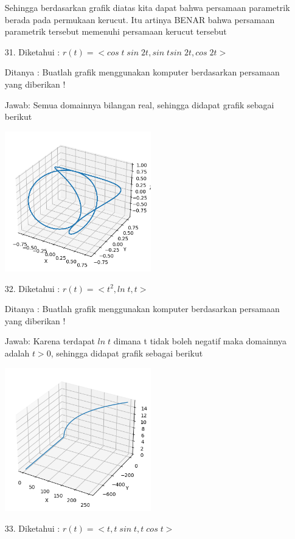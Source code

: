 \documentclass[twoside]{scrarticle}
\begin{document}
\begin{enumerate}
		Sehingga berdasarkan grafik diatas kita dapat bahwa persamaan parametrik berada pada permukaan kerucut. Itu artinya BENAR bahwa persamaan parametrik tersebut memenuhi persamaan kerucut tersebut
		
		\item[31.] Diketahui : $r(t) = <cos\;t\;sin\;2t, sin\;tsin\;2t, cos\;2t>$
		
		Ditanya : Buatlah grafik menggunakan komputer berdasarkan persamaan yang diberikan !
		
		Jawab: Semua domainnya bilangan real, sehingga didapat grafik sebagai berikut
		
		\begin{minipage}{\linewidth}
			\includegraphics[width=0.5\textwidth]{31.png}
			\centering
		\end{minipage}
		
		\item[32.] Diketahui : $r(t) = <t^2, ln\;t, t>$
		
		Ditanya : Buatlah grafik menggunakan komputer berdasarkan persamaan yang diberikan !
		
		Jawab: Karena terdapat $ln\;t$ dimana t tidak boleh negatif maka domainnya adalah $t > 0$, sehingga didapat grafik sebagai berikut
		
		\begin{minipage}{\linewidth}
			\includegraphics[width=0.5\textwidth]{32.png}
			\centering
		\end{minipage}
		\item[33.] Diketahui : $r(t) = <t, t\;sin\;t, t\;cos\;t> $
		

\end{enumerate}
\end{document}
